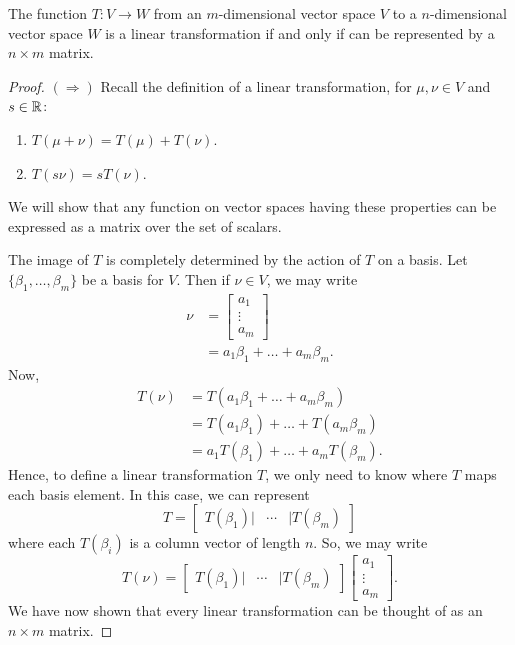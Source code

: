 \documentclass{ximera}
\begin{document}
\begin{lemma}\label{L:MT}
  The function $T: V \to W$ from an $m$-dimensional vector space
  $V$ to a $n$-dimensional vector space $W$ is a linear transformation
  if and only if can be represented by a $n\times m$ matrix.
  \begin{proof}
    $(\Rightarrow)$ Recall the definition of a linear transformation,
    for $\mu,\nu\in V$ and $s\in \mathbb R$:
    \begin{enumerate}
    \item $T(\mu+\nu) = T(\mu)+T(\nu)$.
    \item $T(s \nu) = sT(\nu)$.
    \end{enumerate}
    We will show that any function on vector spaces having these
    properties can be expressed as a matrix over the set of scalars.

    The image of $T$ is completely determined by the action of
    $T$ on a basis. Let $\{\beta_1,\dots,\beta_m\}$ be a
    basis for $V$. Then if $\nu\in V$, we may write
    \begin{align*}
      \nu &= \begin{bmatrix}
        a_1\\
        \vdots \\
        a_m
        \end{bmatrix}\\
      &=a_1\beta_1 + \dots + a_m\beta_m.
    \end{align*}
    Now,
    \begin{align*}
      T(\nu)&=T(a_1\beta_1 + \dots + a_m\beta_m)\\
      &= T(a_1\beta_1) + \dots + T(a_m\beta_m) \\
      &= a_1T(\beta_1) + \dots + a_mT(\beta_m).
    \end{align*}
    Hence, to define a linear transformation $T$, we only need
    to know where $T$ maps each basis element. In this case, we
    can represent
    \[
    T = \begin{bmatrix}
      T(\beta_1)| & \cdots &| T(\beta_m)
    \end{bmatrix}
    \]
    where each $T(\beta_i)$ is a column vector of length $n$.
    So, we may write
    \[
    T(\nu) = \begin{bmatrix}
      T(\beta_1) |& \cdots & |T(\beta_m)
    \end{bmatrix} \begin{bmatrix}
        a_1\\
        \vdots \\
        a_m
        \end{bmatrix}.
    \]
    We have now shown that every linear transformation can be thought
    of as an $n\times m$ matrix.


\end{proof}
\end{lemma}
\end{document}
